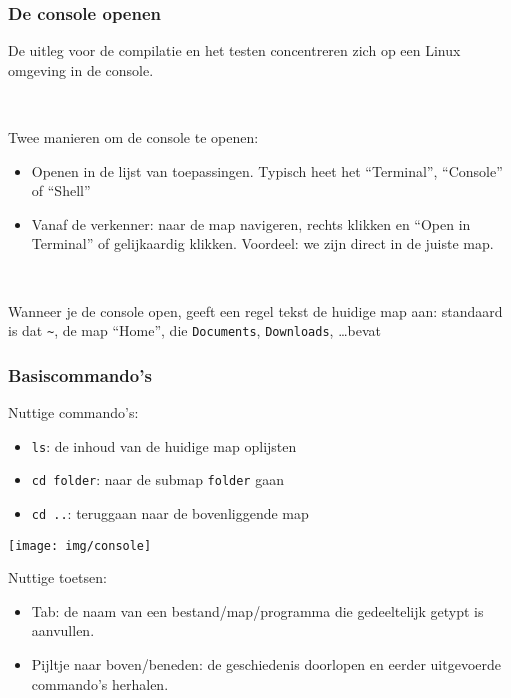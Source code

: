 \documentclass[12pt]{beamer}
\begin{document}
\begin{frame}[fragile]
\frametitle{De console openen}
De uitleg voor de compilatie en het testen concentreren zich op een Linux omgeving in de console.

~

Twee manieren om de console te openen:
\begin{itemize}
\item Openen in de lijst van toepassingen. Typisch heet het ``Terminal'', ``Console'' of ``Shell''
\item Vanaf de verkenner: naar de map navigeren, rechts klikken en ``Open in Terminal'' of gelijkaardig klikken. Voordeel: we zijn direct in de juiste map.
\end{itemize}

~

Wanneer je de console open, geeft een regel tekst de huidige map aan: standaard is dat \lstinline|~|, de map ``Home'', die \lstinline|Documents|, \lstinline|Downloads|, \dots bevat
\end{frame}

\begin{frame}[fragile]
\frametitle{Basiscommando's}
Nuttige commando's:
\begin{itemize}
\item \lstinline|ls|: de inhoud van de huidige map oplijsten
\item \lstinline|cd folder|: naar de submap \lstinline|folder| gaan
\item \lstinline|cd ..|: teruggaan naar de bovenliggende map
\end{itemize}

\begin{center}
\texttt{[image: img/console]}
\end{center}

Nuttige toetsen:
\begin{itemize}
\item Tab: de naam van een bestand/map/programma die gedeeltelijk getypt is aanvullen.
\item Pijltje naar boven/beneden: de geschiedenis doorlopen en eerder uitgevoerde commando's herhalen.
\end{itemize}
\end{frame}
\end{document}
